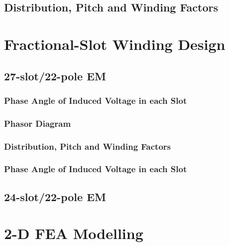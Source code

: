 \documentclass[a4paper, 11pt]{article}
\begin{document}
\subsection{Distribution, Pitch and Winding Factors}

\section{Fractional-Slot Winding Design}
\subsection{27-slot/22-pole EM}
\subsubsection{Phase Angle of Induced Voltage in each Slot}
\subsubsection{Phasor Diagram}
\subsubsection{Distribution, Pitch and Winding Factors}
\subsubsection{Phase Angle of Induced Voltage in each Slot}
\subsection{24-slot/22-pole EM}

\section{2-D FEA Modelling}
\end{document}
